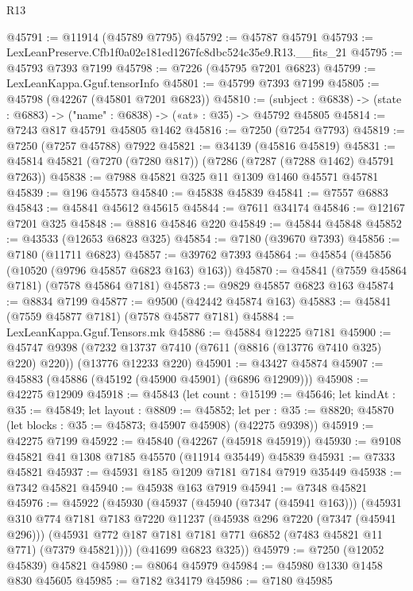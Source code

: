 \begin{lexlean}{R13}
\begin{coremodule}
@45791 := @11914 (@45789 @7795)
@45792 := @45787 @45791
@45793 := LexLeanPreserve.Cfb1f0a02e181ed1267fc8dbc524c35e9.R13.__fits_21
@45795 := @45793 @7393 @7199
@45798 := @7226 (@45795 @7201 @6823)
@45799 := LexLeanKappa.Gguf.tensorInfo
@45801 := @45799 @7393 @7199
@45805 := @45798 (@42267 (@45801 @7201 @6823))
@45810 := (subject : @6838) -> (state : @6883) -> ("name" : @6838) -> («at» : @35) -> @45792 @45805
@45814 := @7243 @817 @45791 @45805 @1462
@45816 := @7250 (@7254 @7793)
@45819 := @7250 (@7257 @45788) @7922
@45821 := @34139 (@45816 @45819)
@45831 := @45814 @45821 (@7270 (@7280 @817)) (@7286 (@7287 (@7288 @1462) @45791 @7263))
@45838 := @7988 @45821 @325 @11 @1309 @1460 @45571 @45781
@45839 := @196 @45573
@45840 := @45838 @45839
@45841 := @7557 @6883
@45843 := @45841 @45612 @45615
@45844 := @7611 @34174
@45846 := @12167 @7201 @325
@45848 := @8816 @45846 @220
@45849 := @45844 @45848
@45852 := @43533 (@12653 @6823 @325)
@45854 := @7180 (@39670 @7393)
@45856 := @7180 (@11711 @6823)
@45857 := @39762 @7393
@45864 := @45854 (@45856 (@10520 (@9796 @45857 @6823 @163) @163))
@45870 := @45841 (@7559 @45864 @7181) (@7578 @45864 @7181)
@45873 := @9829 @45857 @6823 @163
@45874 := @8834 @7199
@45877 := @9500 (@42442 @45874 @163)
@45883 := @45841 (@7559 @45877 @7181) (@7578 @45877 @7181)
@45884 := LexLeanKappa.Gguf.Tensors.mk
@45886 := @45884 @12225 @7181
@45900 := @45747
    @9398
    (@7232 @13737 @7410 (@7611 (@8816 (@13776 @7410 @325) @220) @220))
    (@13776 @12233 @220)
@45901 := @43427 @45874
@45907 := @45883 (@45886 (@45192 (@45900 @45901) (@6896 @12909)))
@45908 := @42275 @12909
@45918 := @45843
    (let count : @15199 := @45646;
    let kindAt : @35 := @45849;
    let layout : @8809 := @45852;
    let per : @35 := @8820; @45870 (let blocks : @35 := @45873; @45907 @45908) (@42275 @9398))
@45919 := @42275 @7199
@45922 := @45840 (@42267 (@45918 @45919))
@45930 := @9108 @45821 @41 @1308 @7185 @45570 (@11914 @35449) @45839
@45931 := @7333 @45821
@45937 := @45931 @185 @1209 @7181 @7184 @7919 @35449
@45938 := @7342 @45821
@45940 := @45938 @163 @7919
@45941 := @7348 @45821
@45976 := @45922
    (@45930
      (@45937
        (@45940 (@7347 (@45941 @163)))
        (@45931
          @310
          @774
          @7181
          @7183
          @7220
          @11237
          (@45938 @296 @7220 (@7347 (@45941 @296)))
          (@45931 @772 @187 @7181 @7181 @771 @6852 (@7483 @45821 @11 @771) (@7379 @45821))))
      (@41699 @6823 @325))
@45979 := @7250 (@12052 @45839) @45821
@45980 := @8064 @45979
@45984 := @45980 @1330 @1458 @830 @45605
@45985 := @7182 @34179
@45986 := @7180 @45985

\end{coremodule}
\end{lexlean}
